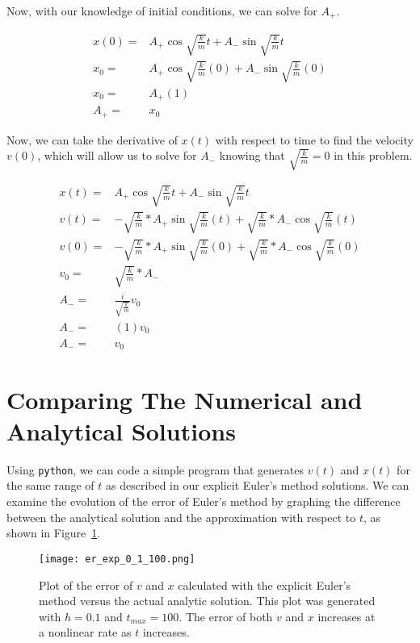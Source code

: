 \documentclass{article}
\begin{document}
Now, with our knowledge of initial conditions, we can solve for $A_+$.

\begin{eqnarray}
    x(0) =& A_+\cos{{\sqrt{\frac{k}{m}}t} + A_-\sin{\sqrt{\frac{k}{m}}t}} \\
    x_0 =& A_+\cos{{\sqrt{\frac{k}{m}}(0)} + A_-\sin{\sqrt{\frac{k}{m}}(0)}} \\
    x_0 =& A_+(1) \\
    A_+ =& x_0
\end{eqnarray}

Now, we can take the derivative of $x(t)$ with respect to time to find the velocity $v(0)$, which will allow us to solve for $A_-$ knowing that $\sqrt{\frac{k}{m}} = 0$ in this problem.

\begin{eqnarray}
    x(t) =& A_+\cos{{\sqrt{\frac{k}{m}}t} + A_-\sin{\sqrt{\frac{k}{m}}t}} \\
    v(t) =& -\sqrt{\frac{k}{m}} * A_+\sin{{\sqrt{\frac{k}{m}}(t)} + \sqrt{\frac{k}{m}} * A_-\cos{\sqrt{\frac{k}{m}}(t)}} \\
    v(0) =& -\sqrt{\frac{k}{m}} * A_+\sin{{\sqrt{\frac{k}{m}}(0)} + \sqrt{\frac{k}{m}} * A_-\cos{\sqrt{\frac{k}{m}}(0)}} \\
    v_0 =& \sqrt{\frac{k}{m}} * A_-\\
    A_- =& \frac{i}{\sqrt{\frac{k}{m}}} v_0 \\
    A_- =& (1) v_0 \\
    A_- =& v_0
\end{eqnarray}

\section{Comparing The Numerical and Analytical Solutions}

Using \texttt{python}, we can code a simple program that generates $v(t)$ and $x(t)$ for the same range of $t$ as described in our explicit Euler's method solutions.  We can examine the evolution of the error of Euler's method by graphing the difference between the analytical solution and the approximation with respect to $t$, as shown in Figure~\ref{fig:err_exp}.

\begin{figure}
    \centering
    \texttt{[image: er\_exp\_0\_1\_100.png]}{}
    \caption{Plot of the error of $v$ and $x$ calculated with the explicit Euler's method versus the actual analytic solution.  This plot was generated with $h = 0.1$ and $t_{max} = 100$.  The error of both $v$ and $x$ increases at a nonlinear rate as $t$ increases.}
    \label{fig:err_exp}
\end{figure}
\end{document}
